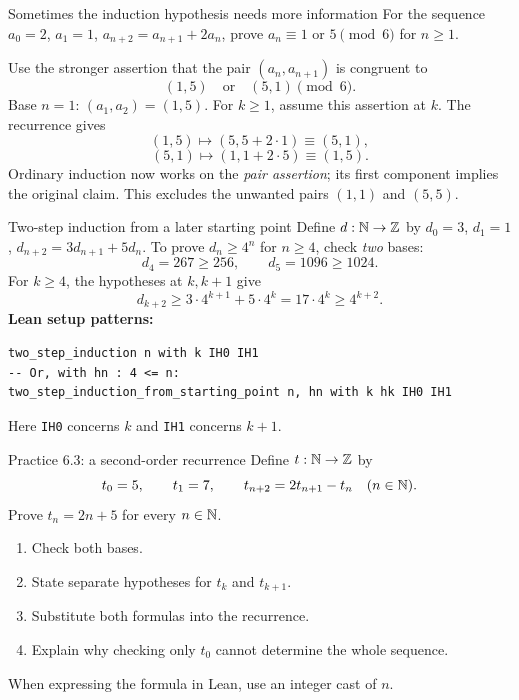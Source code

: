 \begin{frame}{Sometimes the induction hypothesis needs more information}
For the sequence $a_0=2$, $a_1=1$, $a_{n+2}=a_{n+1}+2a_n$,
prove $a_n\equiv1$ or $5\pmod6$ for $n\ge1$.

Use the stronger assertion that the pair $(a_n,a_{n+1})$ is congruent to
\[
 (1,5)\quad\text{or}\quad(5,1)\pmod6.
\]
Base $n=1$: $(a_1,a_2)=(1,5)$.
For $k\ge1$, assume this assertion at $k$. The recurrence gives
\[
 (1,5)\longmapsto(5,5+2\cdot1)\equiv(5,1),
\]
\[
 (5,1)\longmapsto(1,1+2\cdot5)\equiv(1,5).
\]
Ordinary induction now works on the \emph{pair assertion}; its first component
implies the original claim. This excludes the unwanted pairs $(1,1)$ and $(5,5)$.
\end{frame}

\begin{frame}[fragile]{Two-step induction from a later starting point}
Define $d:\mathbb{N}\to\mathbb{Z}$ by $d_0=3$, $d_1=1$,
$d_{n+2}=3d_{n+1}+5d_n$.
To prove $d_n\ge4^n$ for $n\ge4$, check \emph{two} bases:
\[
 d_4=267\ge256,\qquad d_5=1096\ge1024.
\]
For $k\ge4$, the hypotheses at $k,k+1$ give
\[
 d_{k+2}\ge3\cdot4^{k+1}+5\cdot4^k
 =17\cdot4^k\ge4^{k+2}.
\]
\textbf{Lean setup patterns:}
\begin{lstlisting}
two_step_induction n with k IH0 IH1
-- Or, with hn : 4 <= n:
two_step_induction_from_starting_point n, hn with k hk IH0 IH1
\end{lstlisting}
Here \texttt{IH0} concerns $k$ and \texttt{IH1} concerns $k+1$.
\end{frame}

\begin{frame}{Practice 6.3: a second-order recurrence}
Define $t:\mathbb{N}\to\mathbb{Z}$ by
\[
 t_0=5,\qquad t_1=7,\qquad
 t_{n+2}=2t_{n+1}-t_n\quad(n\in\mathbb{N}).
\]
Prove $t_n=2n+5$ for every $n\in\mathbb{N}$.
\begin{enumerate}
\item Check both bases.
\item State separate hypotheses for $t_k$ and $t_{k+1}$.
\item Substitute both formulas into the recurrence.
\item Explain why checking only $t_0$ cannot determine the whole sequence.
\end{enumerate}
When expressing the formula in Lean, use an integer cast of $n$.
\end{frame}

